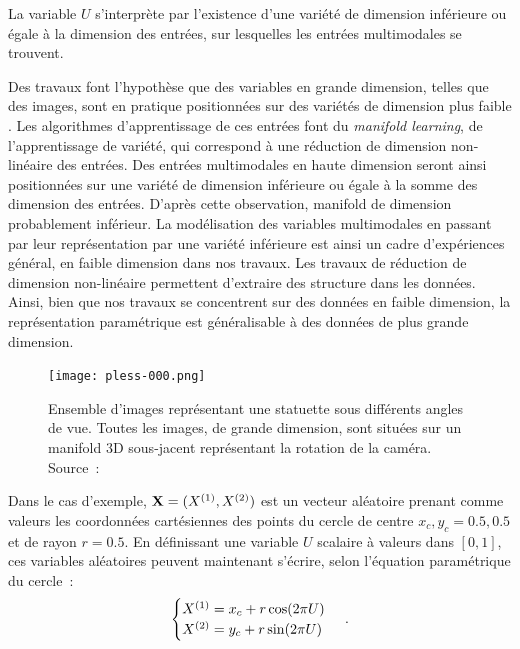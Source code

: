 \documentclass[../main]{subfiles}
\begin{document}
La variable $U$ s'interprète par l'existence d'une variété de dimension inférieure ou égale à la dimension des entrées, sur lesquelles les entrées multimodales se trouvent.

Des travaux font l'hypothèse que des variables en grande dimension, telles que des images, sont en pratique positionnées sur des variétés de dimension plus faible \cite{Pless2009ASO}.
Les algorithmes d'apprentissage de ces entrées font du \emph{manifold learning}, de l'apprentissage de variété, qui correspond à une réduction de dimension non-linéaire des entrées.
Des entrées multimodales en haute dimension seront ainsi positionnées sur une variété de dimension inférieure ou égale à la somme des dimension des entrées.
D'après cette observation, manifold de dimension probablement inférieur.
La modélisation des variables multimodales en passant par leur représentation par une variété inférieure est ainsi un cadre d'expériences général, en faible dimension dans nos travaux.
Les travaux de réduction de dimension non-linéaire permettent d'extraire des structure dans les données.
Ainsi, bien que nos travaux se concentrent sur des données en faible dimension, la représentation paramétrique est généralisable à des données de plus grande dimension.


\begin{figure}
    \centering
    \texttt{[image: pless-000.png]}
    \caption{Ensemble d'images représentant une statuette sous différents angles de vue. Toutes les images, de grande dimension, sont situées sur un manifold 3D sous-jacent représentant la rotation de la caméra. Source~:~\cite{Pless2009ASO}}
\end{figure}


Dans le cas d'exemple, $\mathbf{X} = (X^{({1})},X^{({2})})$ est un vecteur aléatoire prenant comme valeurs les coordonnées cartésiennes des points du cercle de centre $x_c,y_c = 0.5,0.5$ et de rayon $r = 0.5$.
En définissant une variable $U$ scalaire à valeurs dans $[0,1]$, ces variables aléatoires peuvent maintenant s'écrire, selon l'équation paramétrique du cercle~:
\begin{equation}
 \begin{cases}
     X^{({1})}= x_c + r  \cos(2\pi U)\\
     X^{({2})} = y_c + r \sin(2 \pi U)
    \end{cases}\,.
\end{equation}
\end{document}
